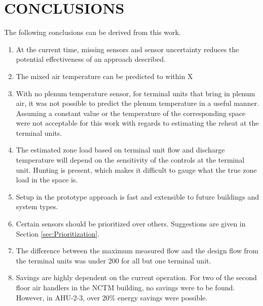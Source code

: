 \chapter{\MakeUppercase{Conclusions}} 

The following conclusions can be derived from this work.

\begin{enumerate}
    \item At the current time, missing sensors and sensor uncertainty 
        reduces the potential effectiveness of an approach described.
    \item The mixed air temperature can be predicted to within X
    \item With no plenum temperature sensor, for terminal units that
        bring in plenum air, it was not possible to predict the plenum
        temperature in a useful manner. Assuming a constant value or the
        temperature of the corresponding space were not acceptable for
        this work with regards to estimating the reheat at the terminal units.
    \item The estimated zone load based on terminal unit flow and
        discharge temperature will depend on the sensitivity of the
        controls at the terminal unit. Hunting is present, which makes
        it difficult to gauge what the true zone load in the space is. 
    \item Setup in the prototype approach is fast and extensible to
        future buildings and system types. 
    \item Certain sensors should be prioritized over others. Suggestions
        are given in Section \ref{sec:Prioritization}. 
    \item The difference between the maximum measured flow and the design flow
        from the terminal units was under \SI{200}{\CFM} for all but one
        terminal unit. 
    \item Savings are highly dependent on the current operation. For two
        of the second floor air handlers in the NCTM building, no
        savings were to be found. However, in AHU-2-3, over 20\% energy
        savings were possible. 
\end{enumerate}
